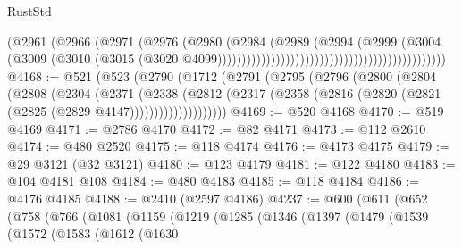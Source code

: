 \begin{lexlean}{RustStd}
\begin{coremodule}
                                                                      (@2961
                                                                        (@2966
                                                                          (@2971
                                                                            (@2976
                                                                              (@2980
                                                                                (@2984
                                                                                  (@2989
                                                                                    (@2994
                                                                                      (@2999
                                                                                        (@3004
                                                                                          (@3009
                                                                                            (@3010
                                                                                              (@3015
                                                                                                (@3020
                                                                                                  @4099)))))))))))))))))))))))))))))))))))))))))))))))
@4168 := @521
    (@523
      (@2790
        (@1712
          (@2791
            (@2795
              (@2796
                (@2800
                  (@2804
                    (@2808
                      (@2304
                        (@2371
                          (@2338
                            (@2812
                              (@2317
                                (@2358 (@2816 (@2820 (@2821 (@2825 (@2829 @4147))))))))))))))))))))
@4169 := @520 @4168
@4170 := @519 @4169
@4171 := @2786 @4170
@4172 := @82 @4171
@4173 := @112 @2610
@4174 := @480 @2520
@4175 := @118 @4174
@4176 := @4173 @4175
@4179 := @29 @3121 (@32 @3121)
@4180 := @123 @4179
@4181 := @122 @4180
@4183 := @104 @4181 @108
@4184 := @480 @4183
@4185 := @118 @4184
@4186 := @4176 @4185
@4188 := @2410 (@2597 @4186)
@4237 := @600
    (@611
      (@652
        (@758
          (@766
            (@1081
              (@1159
                (@1219
                  (@1285
                    (@1346
                      (@1397
                        (@1479
                          (@1539
                            (@1572
                              (@1583
                                (@1612
                                  (@1630

\end{coremodule}
\end{lexlean}
